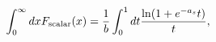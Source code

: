 \begin{equation}
\int_{0}^{\infty} dx F_{\rm scalar} (x) = \frac{1}{b}
\int_{0}^{1} dt \frac{\ln (1 +  e^{- a_s} t) }{t}, 
\end{equation}

